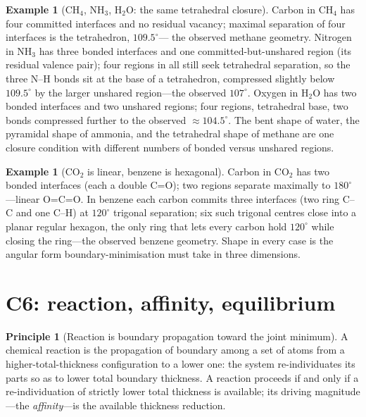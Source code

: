 \documentclass[11pt,a4paper]{article}
\theoremstyle{thmstyle}
\theoremstyle{definition}
\newtheorem{principle}[theorem]{Principle}
\newtheorem{example}[theorem]{Example}
\theoremstyle{remark}
\begin{document}
\begin{example}[CH$_4$, NH$_3$, H$_2$O: the same tetrahedral closure]
\label{ex:shapes}
Carbon in CH$_4$ has four committed interfaces and no residual vacancy;
maximal separation of four interfaces is the tetrahedron, $109.5^\circ$---
the observed methane geometry. Nitrogen in NH$_3$ has three bonded
interfaces and one committed-but-unshared region (its residual valence
pair); four regions in all still seek tetrahedral separation, so the three
N--H bonds sit at the base of a tetrahedron, compressed slightly below
$109.5^\circ$ by the larger unshared region---the observed $107^\circ$.
Oxygen in H$_2$O has two bonded interfaces and two unshared regions; four
regions, tetrahedral base, two bonds compressed further to the observed
$\approx104.5^\circ$. The bent shape of water, the pyramidal shape of
ammonia, and the tetrahedral shape of methane are one closure condition
with different numbers of bonded versus unshared regions.
\end{example}

\begin{example}[CO$_2$ is linear, benzene is hexagonal]
\label{ex:co2benzene}
Carbon in CO$_2$ has two bonded interfaces (each a double C=O); two
regions separate maximally to $180^\circ$---linear O=C=O. In benzene each
carbon commits three interfaces (two ring C--C and one C--H) at
$120^\circ$ trigonal separation; six such trigonal centres close into a
planar regular hexagon, the only ring that lets every carbon hold
$120^\circ$ while closing the ring---the observed benzene geometry. Shape
in every case is the angular form boundary-minimisation must take in
three dimensions.
\end{example}

\section{C6: reaction, affinity, equilibrium}
\label{sec:reaction}

\begin{principle}[Reaction is boundary propagation toward the joint minimum]
\label{prin:reaction}
A chemical reaction is the propagation of boundary among a set of atoms
from a higher-total-thickness configuration to a lower one: the system
re-individuates its parts so as to lower total boundary thickness. A
reaction proceeds if and only if a re-individuation of strictly lower
total thickness is available; its driving magnitude---the
\emph{affinity}---is the available thickness reduction.
\end{principle}
\end{document}
